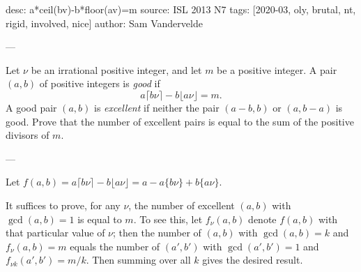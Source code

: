 desc: a*ceil(bv)-b*floor(av)=m
source: ISL 2013 N7
tags: [2020-03, oly, brutal, nt, rigid, involved, nice]
author: Sam Vandervelde

---

Let $\nu$ be an irrational positive integer, and let $m$ be a positive integer. A pair $(a,b)$ of positive integers is \emph{good} if \[a\lceil b\nu\rceil-b\lfloor a\nu\rfloor=m.\]
A good pair $(a,b)$ is \emph{excellent} if neither the pair $(a-b,b)$ or $(a,b-a)$ is good. Prove that the number of excellent pairs is equal to the sum of the positive divisors of $m$.

---

Let $f(a,b)=a\lceil b\nu\rceil-b\lfloor a\nu\rfloor=a-a\{b\nu\}+b\{a\nu\}$.

It suffices to prove, for any $\nu$, the number of excellent $(a,b)$ with $\gcd(a,b)=1$ is equal to $m$. To see this, let $f_\nu(a,b)$ denote $f(a,b)$ with that particular value of $\nu$; then the number of $(a,b)$ with $\gcd(a,b)=k$ and $f_\nu(a,b)=m$ equals the number of $(a',b')$ with $\gcd(a',b')=1$ and $f_{\nu k}(a',b')=m/k$. Then summing over all $k$ gives the desired result.

